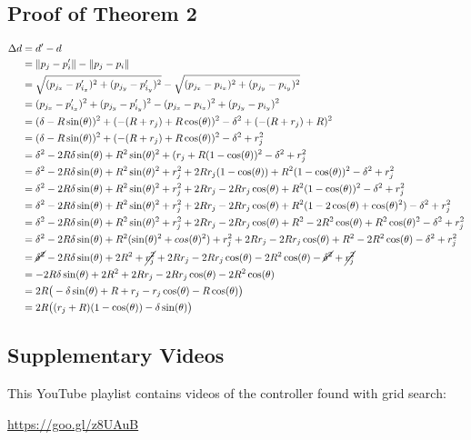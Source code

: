 \documentclass[conference]{IEEEtran}
\begin{document}
  \subsection{Proof of Theorem 2} \label{thm:2}

    \begin{align*}
      \Delta d &= d' - d \\
      &= \lVert p_j - p'_i \rVert - \lVert p_j - p_i \rVert \\
      &=\sqrt{(p_{j_x} - p'_{i_x})^2 + (p_{j_y} - p'_{i_y})^2} - \sqrt{(p_{j_x} - p_{i_x})^2 + (p_{j_y} - p_{i_y})^2} \\
      &=(p_{j_x} - p'_{i_x})^2 + (p_{j_y} - p'_{i_y})^2 - (p_{j_x} - p_{i_x})^2 + (p_{j_y} - p_{i_y})^2 \\
      &= (\delta - R\sin(\theta))^2 + (-(R+r_j) + R\cos(\theta))^2 - \delta^2 + (-(R+r_j) + R)^2 \\
      &= (\delta - R\sin(\theta))^2 + (-(R+r_j) + R\cos(\theta))^2 - \delta^2 + r_j^2 \\
      &= \delta^2 - 2R\delta\sin(\theta) + R^2\sin(\theta)^2 + (r_j + R(1 - \cos(\theta))^2 - \delta^2 + r_j^2 \\
      &= \delta^2 - 2R\delta\sin(\theta) + R^2\sin(\theta)^2 + r_j^2 + 2Rr_j(1 - \cos(\theta)) + R^2(1 - \cos(\theta))^2 - \delta^2 + r_j^2 \\
      &= \delta^2 - 2R\delta\sin(\theta) + R^2\sin(\theta)^2 + r_j^2 + 2Rr_j - 2Rr_j\cos(\theta) + R^2(1 - \cos(\theta))^2 - \delta^2 + r_j^2 \\
      &= \delta^2 - 2R\delta\sin(\theta) + R^2\sin(\theta)^2 + r_j^2 + 2Rr_j - 2Rr_j\cos(\theta) + R^2(1 - 2\cos(\theta) + \cos(\theta)^2) - \delta^2 + r_j^2 \\
      &= \delta^2 - 2R\delta\sin(\theta) + R^2\sin(\theta)^2 + r_j^2 + 2Rr_j - 2Rr_j\cos(\theta) + R^2 - 2R^2\cos(\theta) + R^2\cos(\theta)^2 - \delta^2 + r_j^2 \\
      &= \delta^2 - 2R\delta\sin(\theta) + R^2(\sin(\theta)^2 + cos(\theta)^2) + r_j^2 + 2Rr_j - 2Rr_j\cos(\theta) + R^2 - 2R^2\cos(\theta) - \delta^2 + r_j^2 \\
      &= \cancel{\delta^2} - 2R\delta\sin(\theta) + 2R^2 + \cancel{r_j^2} + 2Rr_j - 2Rr_j\cos(\theta) - 2R^2\cos(\theta) - \cancel{\delta^2} + \cancel{r_j^2} \\
      &= -2R\delta\sin(\theta) + 2R^2 + 2Rr_j - 2Rr_j\cos(\theta) - 2R^2\cos(\theta) \\
      &= 2R\big(-\delta\sin(\theta) + R + r_j - r_j\cos(\theta) - R\cos(\theta)\big) \\
      &= 2R\big((r_j + R)(1 - \cos(\theta))-\delta\sin(\theta)\big) \\
    \end{align*}

  \subsection{Supplementary Videos} \label{section:videos}

    This YouTube playlist contains videos of the controller found with grid search:

    \href{https://www.youtube.com/playlist?list=PL9HqYJ1IkIKVX9EsT5BY9LnBsBPTjc5bB}{https://goo.gl/z8UAuB}
\end{document}
